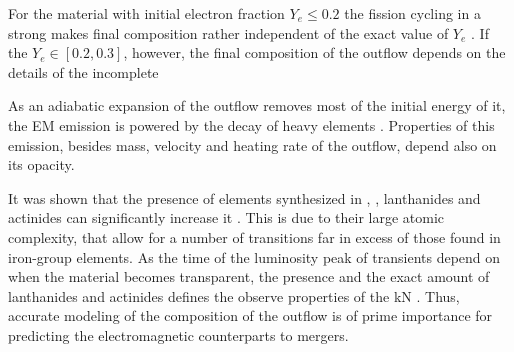 For the material with initial electron fraction $Y_e\leq 0.2$ the fission cycling in a strong \rproc{} makes final composition rather independent of the exact value of $Y_e$ \citep{Metzger:2010,Roberts:2011,Goriely:2011vg}. 
If the $Y_e\in[0.2,0.3]$, however, the final composition of the outflow depends on the details of the incomplete \rproc{} \nuc{} \citep{Korobkin:2012uy,Grossman:2013lqa,Kasen:2014toa}

As an adiabatic expansion of the outflow removes most of the initial energy of it, the \ac{EM} emission is powered by the decay of heavy elements \citep{Metzger:2010}. 
Properties of this emission, besides mass, velocity and heating rate of the outflow, depend also on its opacity. 


%
It was shown that the presence of elements synthesized in \rproc{}, \eg, lanthanides and actinides can significantly increase it \citep{Kasen:2013xka,Tanaka:2013ana}. 
This is due to their large atomic complexity, that allow for a number of transitions far in excess of those found in iron-group elements. 
As the time of the luminosity peak of transients depend on when the material becomes transparent, the presence and the exact amount of lanthanides and actinides defines the observe properties of the \ac{kN} \citep{Barnes:2013wka,Tanaka:2013ana}. 
%
Thus, accurate modeling of the composition of the outflow is of prime importance for predicting the electromagnetic counterparts to mergers. 







